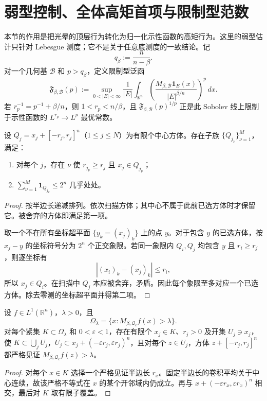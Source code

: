 \section{弱型控制、全体高矩首项与限制型范数}\label{mom:section}

本节的作用是把光晕的顶层行为转化为归一化示性函数的高矩行为。这里的弱型估计只针对 Lebesgue 测度；它不是关于任意底测度的一致结论。记
\[
 q_\beta:=\frac{n}{n-\beta}.
\]
对一个几何基 $\mathcal B$ 和 $p>q_\beta$，定义限制型泛函
\begin{equation}
 \mathfrak F_{\beta,\mathcal B}(p):=
 \sup_{0<|E|<\infty}\frac1{|E|}
 \int_{\mathbb R^n}\left(\frac{M_{\beta,\mathcal B}\mathbf 1_E(x)}{|E|^{\beta/n}}\right)^p\,dx .
 \label{mom:functional}
\end{equation}
若 $r_p^{-1}=p^{-1}+\beta/n$，则 $1<r_p<n/\beta$，且 $\mathfrak F_{\beta,\mathcal B}(p)^{1/p}$ 正是此 Sobolev 线上限制于示性函数的 $L^{r_p}\to L^p$ 最优常数。

\begin{lemma}[有限中心方体的选择]\label{mom:selection}
设 $Q_j=x_j+[-r_j,r_j]^n$（$1\le j\le N$）为有限个中心方体。存在子族 $\{Q_{j_\nu}\}_{\nu=1}^M$，满足：
\begin{enumerate}
\item 对每个 $j$，存在 $\nu$ 使 $r_{j_\nu}\ge r_j$ 且 $x_j\in Q_{j_\nu}$；
\item $\sum_{\nu=1}^M\mathbf 1_{Q_{j_\nu}}\le2^n$ 几乎处处。
\end{enumerate}
\end{lemma}
\begin{proof}
按半边长递减排列。依次扫描方体；其中心不属于此前已选方体时才保留它。被舍弃的方体即满足第一项。

取一个不在所有坐标超平面 $\{y_k=(x_j)_k\}$ 上的点 $y$。对于包含 $y$ 的已选方体，按 $x_j-y$ 的坐标符号分为 $2^n$ 个正交象限。若同一象限内 $Q_i,Q_j$ 均包含 $y$ 且 $r_i\ge r_j$，则逐坐标有
\[
 |(x_i)_k-(x_j)_k|\le r_i,
\]
所以 $x_j\in Q_i$。在扫描中 $Q_j$ 本应被舍弃，矛盾。因此每个象限至多对应一个已选方体。除去零测的坐标超平面并得第二项。
\end{proof}

\begin{lemma}[紧集上的有限稳定见证]\label{mom:stable-witness}
设 $f\in L^1(\mathbb R^n)$，$\lambda>0$，且
\[
 \Omega_\lambda=\{x:M_{\beta,\mathcal Q_c}f(x)>\lambda\}.
\]
对每个紧集 $K\subset\Omega_\lambda$ 和 $0<\varepsilon<1$，存在有限个 $x_j\in K$、$r_j>0$ 及开集 $U_j\ni x_j$，使 $K\subset\bigcup_jU_j$，$U_j\subset x_j+(-\varepsilon r_j,\varepsilon r_j)^n$，且对每个 $z\in U_j$，方体 $z+[-r_j,r_j]^n$ 都严格见证 $M_{\beta,\mathcal Q_c}f(z)>\lambda$。
\end{lemma}
\begin{proof}
对每个 $x\in K$ 选择一个严格见证半边长 $r_x$。固定半边长的卷积平均关于中心连续，故该严格不等式在 $x$ 的某个开邻域内仍成立。再与 $x+(-\varepsilon r_x,\varepsilon r_x)^n$ 相交，最后对 $K$ 取有限子覆盖。
\end{proof}

